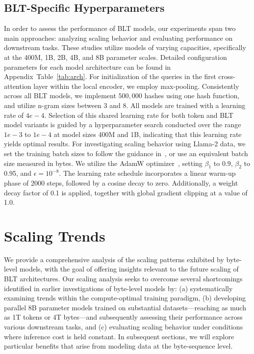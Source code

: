 \subsection{{\textsc BLT}-Specific Hyperparameters} In order to assess the performance of {\textsc BLT} models, our experiments span two main approaches: analyzing scaling behavior and evaluating performance on downstream tasks. These studies utilize models of varying capacities, specifically at the 400M, 1B, 2B, 4B, and 8B parameter scales. Detailed configuration parameters for each model architecture can be found in Appendix~Table~\ref{tab:arch}.  
For initialization of the queries in the first cross-attention layer within the local encoder, we employ max-pooling. Consistently across all {\textsc BLT} models, we implement $500,000$ hashes using one hash function, and utilize n-gram sizes between 3 and 8. All models are trained with a learning rate of $4e-4$. Selection of this shared learning rate for both token and {\textsc BLT} model variants is guided by a hyperparameter search conducted over the range $1e-3$ to $1e-4$ at model sizes 400M and 1B, indicating that this learning rate yields optimal results. For investigating scaling behavior using Llama-2 data, we set the training batch sizes to follow the guidance in~\cite{dubey2024llama}, or use an equivalent batch size measured in bytes.  
We utilize the AdamW optimizer~\citep{adamw}, setting $\beta_1$ to 0.9, $\beta_2$ to 0.95, and $\epsilon=10^{-8}$. The learning rate schedule incorporates a linear warm-up phase of 2000 steps, followed by a cosine decay to zero. Additionally, a weight decay factor of 0.1 is applied, together with global gradient clipping at a value of 1.0.

\section{Scaling Trends}
\label{section:scaling}

We provide a comprehensive analysis of the scaling patterns exhibited by byte-level models, with the goal of offering insights relevant to the future scaling of {\textsc BLT} architectures. Our scaling analysis seeks to overcome several shortcomings identified in earlier investigations of byte-level models by: (a) systematically examining trends within the compute-optimal training paradigm, (b) developing parallel 8B parameter models trained on substantial datasets—reaching as much as 1T tokens or 4T bytes—and subsequently assessing their performance across various downstream tasks, and (c) evaluating scaling behavior under conditions where inference cost is held constant. In subsequent sections, we will explore particular benefits that arise from modeling data at the byte-sequence level.

